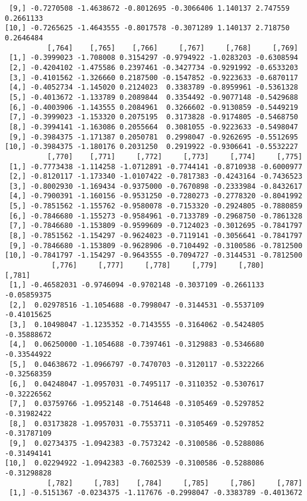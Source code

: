 \documentclass[
  letterpaper,
  DIV=11,
  numbers=noendperiod]{scrreprt}
\begin{document}
\begin{verbatim}
 [9,] -0.7270508 -1.4638672 -0.8012695 -0.3066406 1.140137 2.747559 0.2661133
[10,] -0.7265625 -1.4643555 -0.8017578 -0.3071289 1.140137 2.718750 0.2646484
          [,764]    [,765]    [,766]     [,767]     [,768]     [,769]
 [1,] -0.3999023 -1.708008 0.3154297 -0.9794922 -1.0283203 -0.6308594
 [2,] -0.4204102 -1.475586 0.2397461 -0.3427734 -0.9291992 -0.6533203
 [3,] -0.4101562 -1.326660 0.2187500 -0.1547852 -0.9223633 -0.6870117
 [4,] -0.4052734 -1.145020 0.2124023  0.3383789 -0.8959961 -0.5361328
 [5,] -0.4013672 -1.133789 0.2089844  0.3354492 -0.9077148 -0.5429688
 [6,] -0.4003906 -1.143555 0.2084961  0.3266602 -0.9130859 -0.5449219
 [7,] -0.3999023 -1.153320 0.2075195  0.3173828 -0.9174805 -0.5468750
 [8,] -0.3994141 -1.163086 0.2055664  0.3081055 -0.9223633 -0.5498047
 [9,] -0.3984375 -1.171387 0.2050781  0.2998047 -0.9262695 -0.5512695
[10,] -0.3984375 -1.180176 0.2031250  0.2919922 -0.9306641 -0.5532227
          [,770]    [,771]     [,772]     [,773]     [,774]     [,775]
 [1,] -0.7773438 -1.114258 -1.0712891 -0.7744141 -0.8710938 -0.6000977
 [2,] -0.8120117 -1.173340 -1.0107422 -0.7817383 -0.4243164 -0.7436523
 [3,] -0.8002930 -1.169434 -0.9375000 -0.7670898 -0.2333984 -0.8432617
 [4,] -0.7900391 -1.160156 -0.9531250 -0.7280273 -0.2778320 -0.8041992
 [5,] -0.7851562 -1.155762 -0.9580078 -0.7153320 -0.2924805 -0.7880859
 [6,] -0.7846680 -1.155273 -0.9584961 -0.7133789 -0.2968750 -0.7861328
 [7,] -0.7846680 -1.153809 -0.9599609 -0.7124023 -0.3012695 -0.7841797
 [8,] -0.7851562 -1.154297 -0.9624023 -0.7119141 -0.3056641 -0.7841797
 [9,] -0.7846680 -1.153809 -0.9628906 -0.7104492 -0.3100586 -0.7812500
[10,] -0.7841797 -1.154297 -0.9643555 -0.7094727 -0.3144531 -0.7812500
           [,776]     [,777]     [,778]     [,779]     [,780]      [,781]
 [1,] -0.46582031 -0.9746094 -0.9702148 -0.3037109 -0.2661133 -0.05859375
 [2,]  0.02978516 -1.1054688 -0.7998047 -0.3144531 -0.5537109 -0.41015625
 [3,]  0.10498047 -1.1235352 -0.7143555 -0.3164062 -0.5424805 -0.35888672
 [4,]  0.06250000 -1.1054688 -0.7397461 -0.3129883 -0.5346680 -0.33544922
 [5,]  0.04638672 -1.0966797 -0.7470703 -0.3120117 -0.5322266 -0.32568359
 [6,]  0.04248047 -1.0957031 -0.7495117 -0.3110352 -0.5307617 -0.32226562
 [7,]  0.03759766 -1.0952148 -0.7514648 -0.3105469 -0.5297852 -0.31982422
 [8,]  0.03173828 -1.0957031 -0.7553711 -0.3105469 -0.5297852 -0.31787109
 [9,]  0.02734375 -1.0942383 -0.7573242 -0.3100586 -0.5288086 -0.31494141
[10,]  0.02294922 -1.0942383 -0.7602539 -0.3100586 -0.5288086 -0.31298828
          [,782]     [,783]    [,784]     [,785]     [,786]     [,787]
 [1,] -0.5151367 -0.0234375 -1.117676 -0.2998047 -0.3383789 -0.4013672

\end{verbatim}
\end{document}
